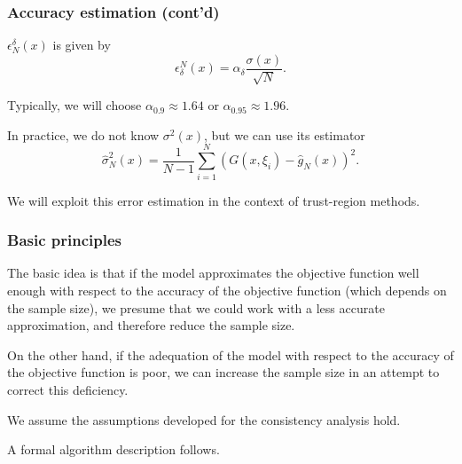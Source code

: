 \documentclass{beamer}
\begin{document}
\begin{frame}
\frametitle{Accuracy estimation (cont'd)}

$\epsilon^{\delta}_N(x)$ is given by
\[
\epsilon_{\delta}^N(x) = \alpha_{\delta} \frac{\sigma(x)}{\sqrt{N}}.
\]

\mbox{}

Typically, we will choose $\alpha_{0.9} \approx 1.64$ or $\alpha_{0.95} \approx 1.96$.

\mbox{}

In practice, we do not know $\sigma^2(x)$, but we can use its estimator
\[
\hat{\sigma}^2_N(x) = \frac{1}{N-1}\sum_{i = 1}^N ( G(x,\xi_i) -
\hat{g}_N(x))^2.
\]

\mbox{}

We will exploit this error estimation in the context of trust-region methods.


\end{frame}

\begin{frame}
\frametitle{Basic principles}

The basic idea is that if the model approximates the objective function well enough with respect to the accuracy of the objective function (which depends on the sample size), we presume that we could work with a less accurate approximation, and therefore reduce the sample size.

\mbox{}

On the other hand, if the adequation of the model with respect to the accuracy of the objective function is poor, we can increase the sample size in an attempt to correct this deficiency.

\mbox{}

We assume the assumptions developed for the consistency analysis hold.

\mbox{}

A formal algorithm description follows.

\end{frame}
\end{document}

